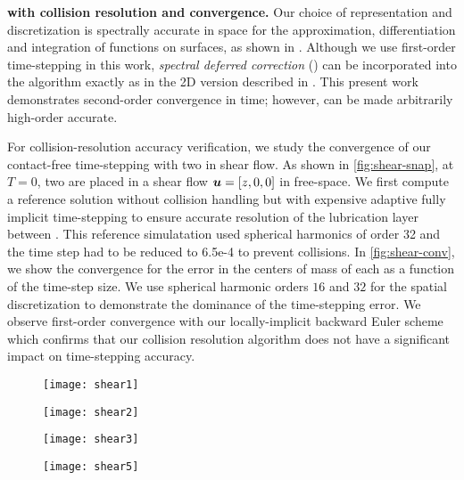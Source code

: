\textbf{\rbcs with collision resolution and convergence. }
Our choice of \rbc  representation and discretization is spectrally
accurate in space for the approximation, differentiation and
integration of functions on \rbc  surfaces, as shown in
\cite{Veerapaneni2011}. Although we use first-order time-stepping in
this work,   \emph{spectral deferred correction} () can be
incorporated into the algorithm exactly as in the 2D version described
in  \cite{lu2017}. This present work demonstrates second-order convergence in
time; however,  can be made arbitrarily high-order
accurate.

For collision-resolution accuracy verification, we study the
convergence of our contact-free time-stepping with two \rbcs in shear
flow. As shown in \cref{fig:shear-snap}, at $T=0$, two \rbcs are
placed in a
shear flow ${\bm{u}} = [z,0,0]$ in free-space. %
We first compute a reference solution without
collision handling  but with expensive adaptive fully implicit time-stepping to
ensure accurate resolution of the lubrication
layer between \rbcs. This reference simulatation used spherical
harmonics of order 32 and the time step had to be reduced to
6.5e-4 to prevent collisions.
In \cref{fig:shear-conv}, we show the convergence for the error in the centers of mass of each \rbc as a function of the time-step size. 
We use spherical harmonic orders $16$ and $32$ for the spatial
discretization to demonstrate the dominance of the time-stepping error. 
We observe first-order convergence with our locally-implicit backward Euler scheme which confirms that our collision resolution algorithm does not have a significant impact on time-stepping accuracy.
\begin{figure}[!htb]
  \centering
  \hfill
  \begin{minipage}{.25\textwidth}
      \centering
    \texttt{[image: shear1]}
  \end{minipage}\hfill
  \begin{minipage}{.25\textwidth}
      \centering
    \texttt{[image: shear2]}
  \end{minipage}\hfill
  \begin{minipage}{.25\textwidth}
      \centering
    \texttt{[image: shear3]}
  \end{minipage}\hfill
  \begin{minipage}{.25\textwidth}
      \centering
    \texttt{[image: shear5]}
  \end{minipage}\hfill
\end{figure}%


